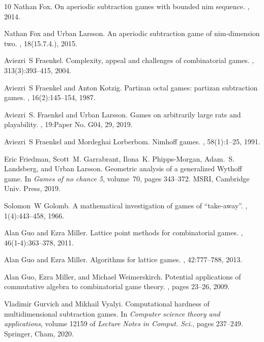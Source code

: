 \documentclass{amsart}
\theoremstyle{plain}
\theoremstyle{definition}
\begin{document}
\begin{thebibliography}{10}
Nathan Fox.
\newblock On aperiodic subtraction games with bounded nim sequence.
, 2014.

Nathan Fox and Urban Larsson.
\newblock An aperiodic subtraction game of nim-dimension two.
, 18(15.7.4.), 2015.

Aviezri~S Fraenkel.
\newblock Complexity, appeal and challenges of combinatorial games.
, 313(3):393--415, 2004.

Aviezri~S Fraenkel and Anton Kotzig.
\newblock Partizan octal games: partizan subtraction games.
, 16(2):145--154, 1987.

Aviezri~S. Fraenkel and Urban Larsson.
\newblock Games on arbitrarily large rats and playability.
, 19:Paper No. G04, 29, 2019.

Aviezri~S Fraenkel and Mordeghai Lorberbom.
\newblock Nimhoff games.
, 58(1):1--25, 1991.

Eric Friedman, Scott~M. Garrabrant, Ilona~K. Phipps-Morgan, Adam.~S. Landsberg,
  and Urban Larsson.
\newblock Geometric analysis of a generalized {W}ythoff game.
\newblock In {\em Games of no chance 5}, volume~70, pages 343--372. MSRI,
  Cambridge Univ. Press, 2019.

Solomon~W Golomb.
\newblock A mathematical investigation of games of “take-away”.
, 1(4):443--458, 1966.

Alan Guo and Ezra Miller.
\newblock Lattice point methods for combinatorial games.
, 46(1-4):363--378, 2011.

Alan Guo and Ezra Miller.
\newblock Algorithms for lattice games.
, 42:777--788, 2013.

Alan Guo, Ezra Miller, and Michael Weimerskirch.
\newblock Potential applications of commutative algebra to combinatorial game
  theory.
, pages 23--26, 2009.

Vladimir Gurvich and Mikhail Vyalyi.
\newblock Computational hardness of multidimensional subtraction games.
\newblock In {\em Computer science theory and applications}, volume 12159 of
  {\em Lecture Notes in Comput. Sci.}, pages 237--249. Springer, Cham, 2020.


\end{thebibliography}
\end{document}
